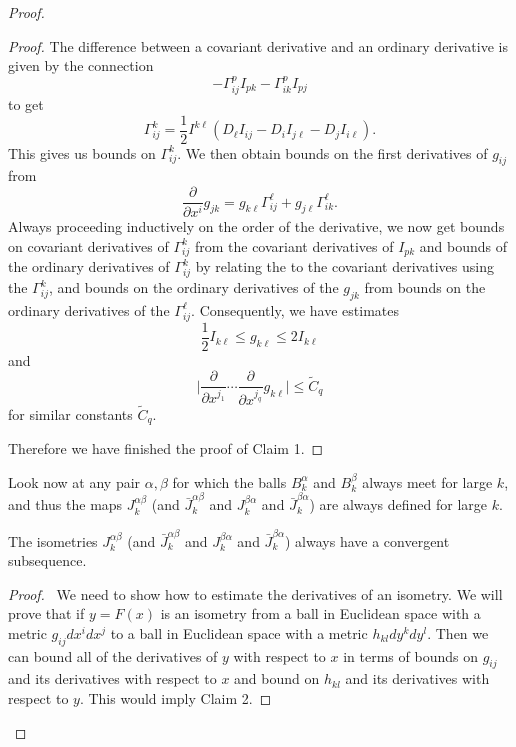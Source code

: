 \begin{proof}
\begin{proof}
The difference between a covariant derivative and an ordinary
derivative is given by the connection
$$
-\Gamma^p_{ij}I_{pk} - \Gamma^p_{ik} I_{pj}
$$
to get
$$
\Gamma^k_{ij} = \frac{1}{2} I^{k \ell}(D_\ell I_{ij} - D_iI_{j
\ell} - D_j I_{i \ell}).
$$
This gives us bounds on $\Gamma^k_{ij}$. We then obtain bounds on
the first derivatives of $g_{ij}$ from
$$
\frac{\partial}{\partial x^i} g_{jk} = g_{k \ell} \Gamma^\ell_{ij}
+ g_{j \ell} \Gamma^\ell_{ik}.
$$
Always proceeding inductively on the order of the derivative, we
now get bounds on covariant derivatives of $\Gamma^k_{ij}$ from
the covariant derivatives of $I_{pk}$ and bounds of the ordinary
derivatives of $\Gamma^k_{ij}$ by relating the to the covariant
derivatives using the $\Gamma^k_{ij}$, and bounds on the ordinary
derivatives of the $g_{jk}$ from bounds on the ordinary
derivatives of the $\Gamma^\ell_{ij}$. Consequently, we have
estimates
$$
\frac{1}{2} I_{k \ell} \leq g_{k \ell} \leq 2I_{k \ell}
$$
and
$$
\Big| \frac{\partial}{\partial x^{j_1}} \cdots
\frac{\partial}{\partial x^{j_q}} g_{k \ell} \Big| \leq
\tilde{C}_q
$$
for similar constants $\tilde{C}_q$.

Therefore we have finished the proof of Claim 1.
\end{proof}

Look now at any pair $\alpha, \beta$ for which the balls
$B_k^{\alpha}$ and $B_k^{\beta}$ always meet for large $k$, and
thus the maps $J_k^{\alpha\beta}$ (and $\bar J_k^{\alpha\beta}$
and $J_k^{\beta\alpha}$ and $\bar J_k^{\beta \alpha}$) are always
defined for large $k$.

\begin{proposition}
  \label{prop:cz-transition-isometry-subsequence-convergence}
The isometries $J_k^{\alpha\beta}$
(and $\bar J_k^{\alpha\beta}$ and $J_k^{\beta\alpha}$ and $\bar
J_k^{\beta\alpha}$) always have a convergent subsequence. \vskip
0.2cm
\end{proposition}
\begin{proof}
\  We need to show how to
estimate the derivatives of an isometry. We will prove that if
$y=F(x)$ is an isometry from a ball in Euclidean space with a
metric $g_{ij}dx^idx^j$ to a ball in Euclidean space with a metric
$h_{kl}dy^kdy^l$. Then we can bound all of the derivatives of $y$
with respect to $x$ in terms of bounds on $g_{ij}$ and its
derivatives with respect to $x$ and bound on $h_{kl}$ and its
derivatives with respect to $y$. This would imply Claim 2.


\end{proof}
\end{proof}
